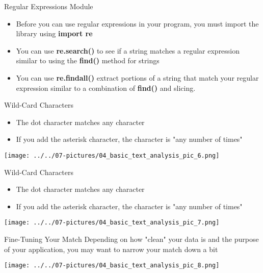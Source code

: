 \documentclass[11pt]{beamer}
\begin{document}
\begin{frame}{Regular Expressions Module}
	\begin{itemize}
		\item Before you can use regular expressions in your program, you must import the library using \textbf{import re}
		\item You can use \textbf{re.search()} to see if a string matches a regular expression similar to using the \textbf{find()} method for strings
		\item You can use \textbf{re.findall()} extract portions of a string that match your regular expression similar to a combination of \textbf{find()} and slicing.
	\end{itemize}
\end{frame}
\begin{frame}{Wild-Card Characters}
	\begin{itemize}
		\item The dot character matches any character
		\item If you add the asterisk character, the character is "any number of times"
	\end{itemize}
	\begin{center}
	\texttt{[image: ../../07-pictures/04\_basic\_text\_analysis\_pic\_6.png]}
	\end{center}
\end{frame}
\begin{frame}{Wild-Card Characters}
	\begin{itemize}
		\item The dot character matches any character
		\item If you add the asterisk character, the character is "any number of times"
	\end{itemize}
	\begin{center}
	\texttt{[image: ../../07-pictures/04\_basic\_text\_analysis\_pic\_7.png]}
	\end{center}
\end{frame}
\begin{frame}{Fine-Tuning Your Match}
	Depending on how "clean" your data is and the purpose of your application, you may want to narrow your match down a bit
	\begin{center}
	\texttt{[image: ../../07-pictures/04\_basic\_text\_analysis\_pic\_8.png]}
	\end{center}
\end{frame}
\end{document}
